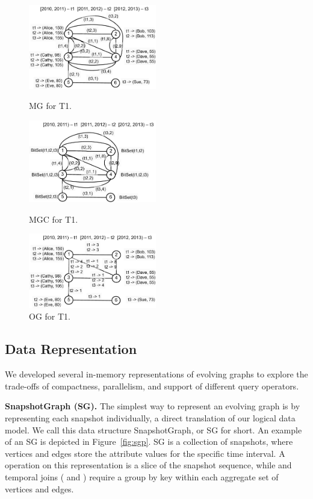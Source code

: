 \begin{figure}[th!]
\begin{minipage}{2.3in}
\centering
\includegraphics[width=2.2in]{figs/mg.pdf}
\caption{MG for T1.}
\label{fig:mg}
\end{minipage}
\begin{minipage}{2.3in}
\centering
\includegraphics[width=2.2in]{figs/mgc.pdf}
\caption{MGC for T1.}
\label{fig:mgc}
\end{minipage}
\begin{minipage}{2.3in}
\centering
\includegraphics[width=2.2in]{figs/og.pdf}
\caption{OG for T1.}
\label{fig:og}
\end{minipage}
\end{figure}



\subsection{Data Representation}
\label{sec:sys:datastructs}

We developed several in-memory representations of evolving graphs to
explore the trade-offs of compactness, parallelism, and support of
different query operators. 

{\bf SnapshotGraph (SG).} The simplest way to represent an evolving
graph is by representing each snapshot individually, a direct
translation of our logical data model.  We call this data structure
SnapshotGraph, or SG for short. An example of an SG is depicted in
Figure~\ref{fig:sgp}.  SG is a collection of snapshots, where vertices
and edges store the attribute values for the specific time interval.
A  operation on this representation is a slice of the
snapshot sequence, while  and temporal joins
( and ) require a group by key within each
aggregate set of vertices and edges.

